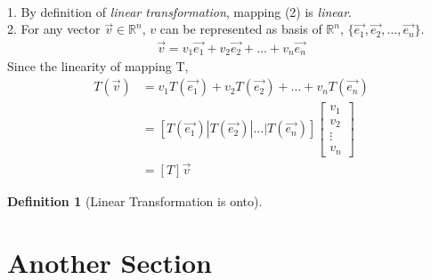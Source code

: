 \documentclass[a4paper,12pt]{article}
\makeatletter
\renewenvironment{proof}[1][\proofname] {\par\pushQED{\qed}\normalfont\topsep6\p@\@plus6\p@\relax\trivlist\item[\hskip\labelsep\bfseries#1\@addpunct{.}]\ignorespaces}{\popQED\endtrivlist\@endpefalse}
\theoremstyle{break}
\newtheorem{definition}[theorem]{Definition}
\makeatother
\begin{document}
\begin{proof}[Proof of theorem \ref{thm:mlt}] \hfill \\
1. By definition of \textit{linear transformation}, mapping (2) is \textit{linear}.\\
2. For any vector $\overrightarrow{v}\in \mathbb{R}^n$, $v$ can be represented as basis of $\mathbb{R}^n$, $\{\overrightarrow{e_1},\overrightarrow{e_2}, \dots, \overrightarrow{e_n}\}$.
\begin{align}
    \overrightarrow{v} = v_1\overrightarrow{e_1}+v_2\overrightarrow{e_2}+\dots+v_n\overrightarrow{e_n}
\end{align}
Since the linearity of mapping T,
\begin{align*}
    T(\overrightarrow{v})&=v_1T(\overrightarrow{e_1})+v_2T(\overrightarrow{e_2})+\dots+v_nT(\overrightarrow{e_n})\\
    &=[T(\overrightarrow{e_1})|T(\overrightarrow{e_2})|\dots|T(\overrightarrow{e_n})]\begin{bmatrix}v_1 \\ v_2 \\ \vdots \\ v_n\end{bmatrix}\\
    &= [T]\overrightarrow{v}
\end{align*}
\end{proof}

\begin{definition} [Linear Transformation is onto]

\end{definition}

\section{Another Section}
\end{document}
